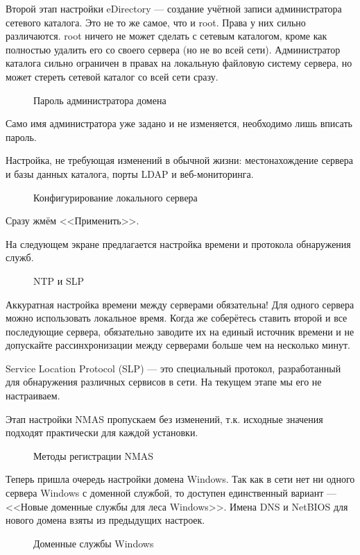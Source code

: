 \label{sec:eDirpass}
Второй этап настройки eDirectory --- создание учётной записи администратора сетевого каталога. Это не то же самое, что и root. Права у них сильно различаются. root ничего не может сделать с сетевым каталогом, кроме как полностью удалить его со своего сервера (но не во всей сети). Администратор каталога сильно ограничен в правах на локальную файловую систему сервера, но может стереть сетевой каталог со всей сети сразу.
\begin{figure}[H]
\caption{Пароль администратора домена}
\end{figure}
Само имя администратора уже задано и не изменяется, необходимо лишь вписать пароль.
\clearpage

Настройка, не требующая изменений в обычной жизни: местонахождение сервера и базы данных каталога, порты LDAP и веб-мониторинга.
\begin{figure}[H]
\caption{Конфигурирование локального сервера}
\end{figure}
Сразу жмём <<Применить>>.
\clearpage

На следующем экране предлагается настройка времени и протокола обнаружения служб.
\begin{figure}[H]
\caption{NTP и SLP}
\end{figure}
Аккуратная настройка времени между серверами обязательна! Для одного сервера можно использовать локальное время. Когда же соберётесь ставить второй и все последующие сервера, обязательно заводите их на единый источник времени и не допускайте рассинхронизации между серверами больше чем на несколько минут.\par
Service Location Protocol (SLP) --- это специальный протокол, разработанный для обнаружения различных сервисов в сети. На текущем этапе мы его не настраиваем.
\clearpage

Этап настройки NMAS пропускаем без изменений, т.к. исходные значения подходят практически для каждой установки.
\begin{figure}[H]
\caption{Методы регистрации NMAS}
\end{figure}
\clearpage

Теперь пришла очередь настройки домена Windows. Так как в сети нет ни одного сервера Windows с доменной службой, то доступен единственный вариант --- <<Новые доменные службы для леса Windows>>. Имена DNS и NetBIOS для нового домена взяты из предыдущих настроек. 
\begin{figure}[H]
\caption{Доменные службы Windows}
\end{figure}
\clearpage

